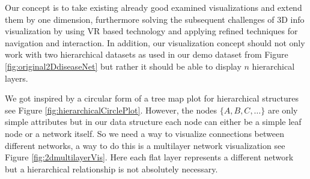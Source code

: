 Our concept is to take existing already good examined visualizations and extend them by one dimension, furthermore solving the subsequent challenges of 3D info visualization by using VR based technology and applying refined techniques for navigation and interaction. 
In addition, our visualization concept should not only work with two hierarchical datasets as used in our demo dataset from Figure \ref{fig:original2DdiseaseNet} but rather it should be able to display $n$ hierarchical layers.

We got inspired by a circular form of a tree map plot for hierarchical structures see Figure \ref{fig:hierarchicalCirclePlot}. However, the nodes $\{A,B,C,\dots\}$ are only simple attributes but in our data structure each node can either be a simple leaf node or a network itself. So we need a way to visualize connections between different networks, a way to do this is a multilayer network visualization see Figure \ref{fig:2dmultilayerVis}. Here each flat layer represents a different network but a hierarchical relationship is not absolutely necessary.  

